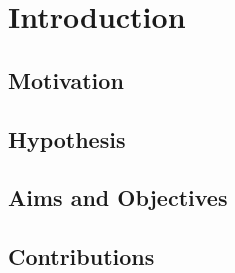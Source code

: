 \chapter{Introduction}

\section{Motivation}


\section{Hypothesis}


\section{Aims and Objectives}


\section{Contributions}